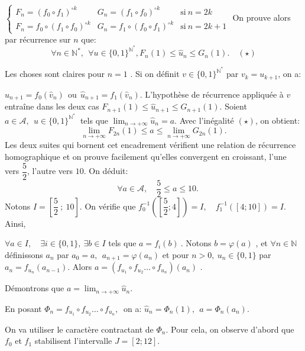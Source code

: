 $\left\{\begin{array}{lll} F_n = (f_0 \circ f_1)^{\circ k}& G_n = (f_1 \circ f_0) ^{\circ k} & \text{si} \: n=2k \\ F_n =f_0\circ (f_1\circ f_0)^{\circ k} & G_n = f_1 \circ ( f_0 \circ f_1)^{\circ k} & \text{si} \: n =2k+1 \end{array} \right. $
On prouve alors par récurrence sur $n$ que:  $$\forall n \in \mathbb N^*,\:\: \forall u \in \{0,1\} ^{\mathbb N^*},  F_n(1) \leqslant \widehat u_n \leqslant G_n(1). \quad (\star)$$  

Les choses sont claires pour $n=1$ .  Si on définit $v\in \{0,1\} ^{\mathbb N^*} $ par $v_k =u_{k+1}$, on a:   

$ \widehat u _{n+1}= f_0 (\widehat v _n)\:\:\text{ou} \:\: \widehat u_{n+1}= f_1 (\widehat v_n).$
L'hypothèse de récurrence appliquée à $v$ entraîne dans les deux cas  $F_{n+1}(1) \leqslant \widehat u _{n+1} \leqslant G_{n+1}(1).$ 
Soient $a\in \mathcal A,\:\: u \in\{0,1\} ^{\mathbb N^*}\:$ tels que $\displaystyle \lim_{n \to + \infty} \widehat u_n =a.$  Avec l'inégalité $(\star)$, on obtient: $$\displaystyle \lim_{n\to + \infty} F_{2n }(1) \leqslant a \leqslant\lim_ {n \to + \infty} G_{2n} (1).$$ 
Les deux suites qui bornent cet encadrement vérifient une relation de récurrence homographique et on prouve facilement qu'elles convergent  en croissant, l'une vers $ \dfrac 52$, l'autre vers $10.$ On déduit:
$$\quad \forall a \in \mathcal A,\quad\dfrac 52 \leqslant a \leqslant 10. $$ 
Notons $I=\left [ \dfrac 52\:;\: 10\right].$ On vérifie que $ f_0^{-1} \left( \left[ \dfrac 52 ; 4\right]\right) =I,\quad f_1^{-1} \left(\left[ 4 ; 10\right]\right) =I.$ Ainsi,

$\forall a \in I,\quad \exists i \in \{0,1\}, \:\exists b \in I $ tels que  $a = f_i (b)\:$. Notons $ b =\varphi (a)$ ,  et $\forall n \in \mathbb N $ définissons $a_n$ par
$a_0 = a , \:\: a_{n+1} = \varphi (a_n)$  et pour $n>0 ,\: u_n \in \{0,1\}$ par $a_n = f_{u_n} (a_{n-1})$. Alors  $a = \left (f_{u_1} \circ f_{u_2} \dots \circ f_{u_n} \right) (a_n)$ .

Démontrons que $\displaystyle  a=\lim_{n \to + \infty} \widehat u_n.$ 

En posant $\Phi _n = f_{u_1}\circ f_{u_2} \dots \circ f_{u_n},\:$ on a: $\widehat u_n = \Phi_n(1),\:\:a = \Phi _n (a_n).$ 

On va utiliser le caractère contractant de $\Phi_n$. 
Pour cela, on observe d'abord que $f_0$ et $f_1$ stabilisent l'intervalle $J=[2 ; 12].$   

